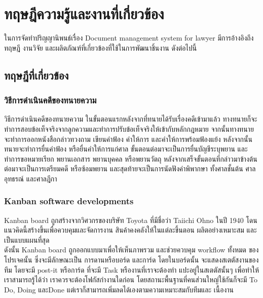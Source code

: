 \documentclass[12pt,oneside,openright,a4paper]{cpe-thai-project}
\begin{document}
\chapter{ทฤษฎีความรู้และงานที่เกี่ยวข้อง}

\hspace*{1cm}ในการจัดทําปริญญานิพนธ์เรื่อง Document management system for lawyer มีการอ้างอิงถึงทฤษฎี งานวิจัย และผลิตภัณฑ์ที่เกี่ยวข้องที่ใช้ในการพัฒนาชิ้นงาน ดังต่อไปนี้

\section{ทฤษฎีที่เกี่ยวข้อง}

\subsection{วิธีการดำเนินคดีของทนายความ} 
\hspace*{1cm}วิธีการดำเนินคดีของทนายความ \cite{LawyerDefinition, StepOfLawyer} ในขั้นตอนแรกหลังจากที่ทนายได้รับเรื่องคดีเข้ามาแล้ว ทางทนายก็จะทำการสอบข้อเท็จจริงจากลูกความและทำการปรับข้อเท็จจริงให้เข้ากับหลักกฎหมาย จากนั้นทางทนายจะทำการออกหนังสือกล่าวทวงถาม เขียนคำฟ้อง คำให้การ และคำให้การพร้อมฟ้องแย้ง หลังจากนั้นทนายจะทำการยื่นคำฟ้อง หรือยื่นคำให้การแก่ศาล ขั้นตอนต่อมาจะเป็นการยื่นบัญชีระบุพยาน และทำการขอหมายเรียก พยานเอกสาร พยานบุคคล หรือพยานวัตถุ หลังจากเสร็จขั้นตอนที่กล่าวมาข้างต้นต่อมาจะเป็นการเตรียมคดี หรือซ้อมพยาน และสุดท้ายจะเป็นการนัดฟังคำพิพากษา ทั้งศาลชั้นต้น ศาลอุทธรณ์ และศาลฎีกา 

\subsection{Kanban software developments} 
\hspace*{1cm}Kanban board \cite{WhatIsKanban, KanbanConcept} ถูกสร้างจากวิศวกรของบริษัท Toyota ที่มีชื่อว่า Taiichi Ohno ในปี 1940 โดนแนวคิดนี้สร้างขึ้นเพื่อควบคุมและจัดการงาน สินค้าคงคลังให้ในแต่ละขึ้นตอน ผลิตอย่างเหมาะสม และเป็นแบบแผนที่สุด\\
\hspace*{1cm}ดังนั้น Kanban board ถูกออกแบบมาเพื่อให้เห็นภาพรวม และช่วยควบคุม workflow ทั้งหมด ของโปรเจคนั้น ซึ่งจะมีลักษณะเป็น การดานหรือบอร์ด และการ์ด โดยในบอร์ดนั้น จะแสดงสเตตัสงานของทีม โดยจะมี post-it หรือการ์ด ที่จะมี Task หรืองานที่เราจะต้องทำ แปะอยู่ในสเตตัสนั้นๆ เพื่อทำให้เราสามารถรู้ได้ว่า เราควรจะต้องโฟกัสกำงานใดก่อน โดยสถานะพื้นฐานที่คนส่วนใหญ่ใช้กันก็จะมี To Do, Doing และDone แต่เราก็สามารถเพิ่มลดได้เองตามความเหมาะสมกับทีมและ เนื้องาน
\end{document}
